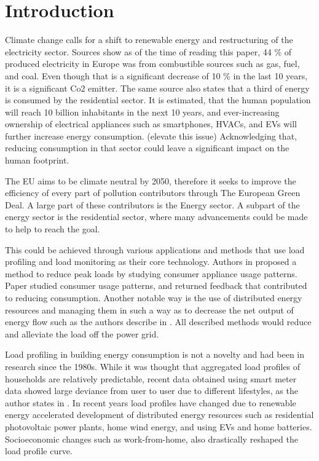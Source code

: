 \chapter{Introduction}
\label{chapter1}

Climate change calls for a shift to renewable energy and restructuring of the electricity sector.
Sources \cite{eurostat2020} show as of the time of reading this paper, 44 \% of produced electricity in Europe was from combustible sources such as gas, fuel, and coal. Even 
though that is a significant decrease of 10 \% in the last 10 years, it is a significant Co2 emitter.
The same source \cite{eurostat2020} also states that a third of energy is consumed by the residential sector. It is estimated, 
that the human population will reach 10 billion inhabitants in the next 10 years, and ever-increasing ownership of electrical appliances such as smartphones, HVACs, and EVs will further increase energy consumption. (elevate this issue)
Acknowledging that, reducing consumption in that sector could leave a significant impact on the human footprint. 


The EU aims to be climate neutral by 2050, therefore it seeks to improve the efficiency of every part of pollution contributors through The European Green Deal.
A large part of these contributors is the Energy sector.
A subpart of the energy sector is the residential sector, where many advancements could be made to help to reach the goal.  

This could be achieved through various applications and methods that use load profiling and load monitoring as their core technology.
Authors in \cite{Chuan2014} proposed a method to reduce peak loads by studying consumer
appliance usage patterns. Paper \cite{Csoknyai2019} studied consumer usage patterns, and returned feedback that contributed to reducing consumption.
Another notable way is the use of distributed energy resources and managing them in such a way as to decrease the net output of energy flow such as the authors describe in
\cite{MORENOJARAMILLO2021445}. All described methods would reduce and alleviate the load off the power grid.


Load profiling in building energy consumption is not a novelty and had been in research since the 1980s.
While it was thought that aggregated load profiles of households are relatively predictable, recent data obtained using smart meter data showed large deviance from user to user due to different lifestyles, as the author states in \cite{Review2021}.
In recent years load profiles have changed due to renewable energy accelerated development of distributed energy resources such as residential photovoltaic
power plants, home wind energy, and using EVs and home batteries. Socioeconomic changes such as work-from-home, also drastically reshaped the load profile curve. 

